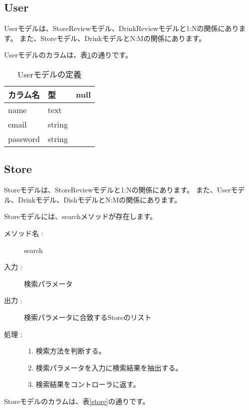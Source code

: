 \documentclass[a4j,titlepage]{jarticle}
\begin{document}
\subsection{User}
Userモデルは、StoreReviewモデル、DrinkReviewモデルと1:Nの関係にあります。
また、Storeモデル、DrinkモデルとN:Mの関係にあります。

Userモデルのカラムは、表\ref{user}の通りです。

\begin{table}[!htbp]
\caption{Userモデルの定義}
\label{user}
\small
\begin{center}
\begin{tabular}{|l|l|c|}\hline
カラム名 & 型 & null \\\hline\hline
name & text & \\\hline
email & string & \\\hline
password & string & \\\hline
\end{tabular}
\end{center}
\end{table}

\subsection{Store}
Storeモデルは、StoreReviewモデルと1:Nの関係にあります。
また、Userモデル、Drinkモデル、DishモデルとN:Mの関係にあります。

Storeモデルには、searchメソッドが存在します。

\begin{description}
\item [メソッド名 :] search
\item [入力 :] 検索パラメータ
\item [出力 :] 検索パラメータに合致するStoreのリスト
\item [処理 :]\mbox{}
  \begin{enumerate}
  \item 検索方法を判断する。
  \item 検索パラメータを入力に検索結果を抽出する。
  \item 検索結果をコントローラに返す。
  \end{enumerate}
\end{description}

Storeモデルのカラムは、表\ref{store}の通りです。
\end{document}
